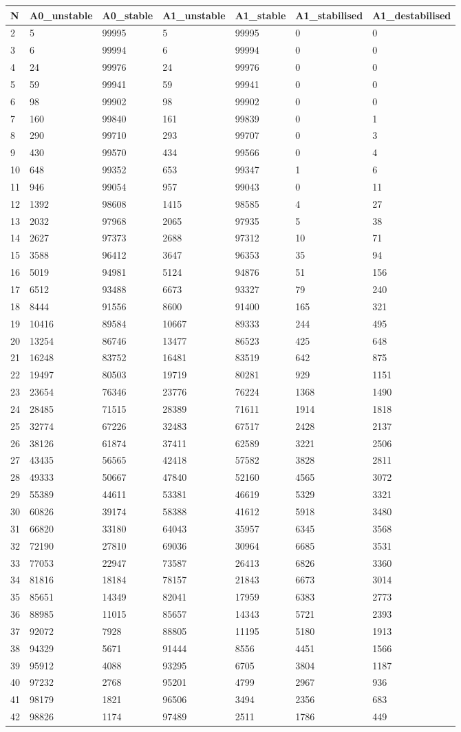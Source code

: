 \documentclass[]{article}
\begin{document}
\begin{longtable}[]{@{}lllllll@{}}
\toprule
N & A0\_unstable & A0\_stable & A1\_unstable & A1\_stable &
A1\_stabilised & A1\_destabilised\tabularnewline
\midrule
\endhead
2 & 5 & 99995 & 5 & 99995 & 0 & 0\tabularnewline
3 & 6 & 99994 & 6 & 99994 & 0 & 0\tabularnewline
4 & 24 & 99976 & 24 & 99976 & 0 & 0\tabularnewline
5 & 59 & 99941 & 59 & 99941 & 0 & 0\tabularnewline
6 & 98 & 99902 & 98 & 99902 & 0 & 0\tabularnewline
7 & 160 & 99840 & 161 & 99839 & 0 & 1\tabularnewline
8 & 290 & 99710 & 293 & 99707 & 0 & 3\tabularnewline
9 & 430 & 99570 & 434 & 99566 & 0 & 4\tabularnewline
10 & 648 & 99352 & 653 & 99347 & 1 & 6\tabularnewline
11 & 946 & 99054 & 957 & 99043 & 0 & 11\tabularnewline
12 & 1392 & 98608 & 1415 & 98585 & 4 & 27\tabularnewline
13 & 2032 & 97968 & 2065 & 97935 & 5 & 38\tabularnewline
14 & 2627 & 97373 & 2688 & 97312 & 10 & 71\tabularnewline
15 & 3588 & 96412 & 3647 & 96353 & 35 & 94\tabularnewline
16 & 5019 & 94981 & 5124 & 94876 & 51 & 156\tabularnewline
17 & 6512 & 93488 & 6673 & 93327 & 79 & 240\tabularnewline
18 & 8444 & 91556 & 8600 & 91400 & 165 & 321\tabularnewline
19 & 10416 & 89584 & 10667 & 89333 & 244 & 495\tabularnewline
20 & 13254 & 86746 & 13477 & 86523 & 425 & 648\tabularnewline
21 & 16248 & 83752 & 16481 & 83519 & 642 & 875\tabularnewline
22 & 19497 & 80503 & 19719 & 80281 & 929 & 1151\tabularnewline
23 & 23654 & 76346 & 23776 & 76224 & 1368 & 1490\tabularnewline
24 & 28485 & 71515 & 28389 & 71611 & 1914 & 1818\tabularnewline
25 & 32774 & 67226 & 32483 & 67517 & 2428 & 2137\tabularnewline
26 & 38126 & 61874 & 37411 & 62589 & 3221 & 2506\tabularnewline
27 & 43435 & 56565 & 42418 & 57582 & 3828 & 2811\tabularnewline
28 & 49333 & 50667 & 47840 & 52160 & 4565 & 3072\tabularnewline
29 & 55389 & 44611 & 53381 & 46619 & 5329 & 3321\tabularnewline
30 & 60826 & 39174 & 58388 & 41612 & 5918 & 3480\tabularnewline
31 & 66820 & 33180 & 64043 & 35957 & 6345 & 3568\tabularnewline
32 & 72190 & 27810 & 69036 & 30964 & 6685 & 3531\tabularnewline
33 & 77053 & 22947 & 73587 & 26413 & 6826 & 3360\tabularnewline
34 & 81816 & 18184 & 78157 & 21843 & 6673 & 3014\tabularnewline
35 & 85651 & 14349 & 82041 & 17959 & 6383 & 2773\tabularnewline
36 & 88985 & 11015 & 85657 & 14343 & 5721 & 2393\tabularnewline
37 & 92072 & 7928 & 88805 & 11195 & 5180 & 1913\tabularnewline
38 & 94329 & 5671 & 91444 & 8556 & 4451 & 1566\tabularnewline
39 & 95912 & 4088 & 93295 & 6705 & 3804 & 1187\tabularnewline
40 & 97232 & 2768 & 95201 & 4799 & 2967 & 936\tabularnewline
41 & 98179 & 1821 & 96506 & 3494 & 2356 & 683\tabularnewline
42 & 98826 & 1174 & 97489 & 2511 & 1786 & 449\tabularnewline

\end{longtable}
\end{document}
